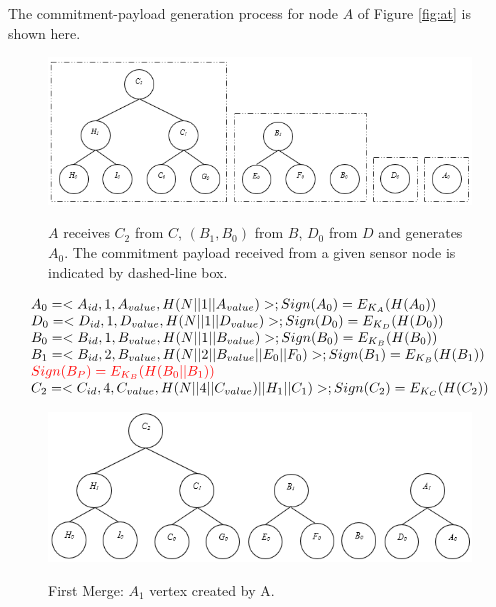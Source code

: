 			\begin{exmp} The commitment-payload generation process for node $A$ of Figure \ref{fig:at} is shown here.\\
				\begin{figure}[h!]
					\centering
					\includegraphics[scale = 1]{images/commitment-tree-example-1.png}\\
					\caption{$A$ receives $C_{2}$ from $C$, $(B_{1},B_{0})$ from $B$, $D_{0}$ from $D$ and generates $A_{0}$. The commitment payload received from a given sensor node is indicated by dashed-line box.}
					\label{fig:commitment-tree-example-1}
				\end{figure}
				\begin{equation}
					\begin{array}{l}
						A_{0} = <A_{id}, 1, A_{value}, H(N||1||A_{value})>; Sign(A_{0}) = E_{K_{A}}(H(A_{0})) \\
						D_{0} = <D_{id}, 1, D_{value}, H(N||1||D_{value})>; Sign(D_{0}) = E_{K_{D}}(H(D_{0}))\\
						B_{0} = <B_{id}, 1, B_{value}, H(N||1||B_{value})>; Sign(B_{0}) = E_{K_{B}}(H(B_{0}))\\
						B_{1} = <B_{id}, 2, B_{value}, H(N||2||B_{value}||E_{0}||F_{0})>; Sign(B_{1}) = E_{K_{B}}(H(B_{1}))\\
						\textcolor{red}{Sign(B_{P}) = E_{K_{B}}(H(B_{0} || B_{1}))}\\
						C_{2} = <C_{id}, 4, C_{value}, H(N||4||C_{value})||H_{1}||C_{1})>; Sign(C_{2}) = E_{K_{C}}(H(C_{2}))\\
						\end{array}
				\end{equation}

				\begin{figure}[h!]
					\centering
					\includegraphics[scale = 1]{images/commitment-tree-example-2.png}\\
					\caption{First Merge: $A_{1}$ vertex created by A.}
					\label{fig:commitment-tree-example-2}
				\end{figure}


\end{exmp}
